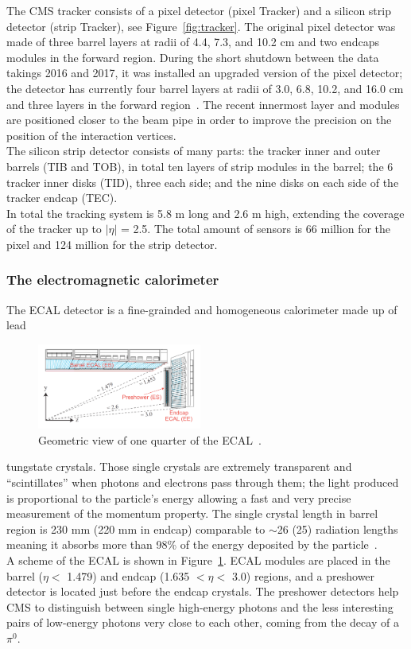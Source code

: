 The CMS tracker consists of a pixel detector (pixel Tracker) and a
silicon strip detector (strip Tracker), see Figure~\ref{fig:tracker}.
The original pixel detector was made of three barrel
layers at radii of 4.4, 7.3, and 10.2 cm and two endcaps modules in
the forward region. 
During the short shutdown between the data takings 2016 and 2017, it
was installed an
upgraded version of the pixel detector; the detector has currently four
barrel layers at radii of 3.0, 6.8, 10.2, and
16.0 cm and three layers in the forward region~\cite{Dominguez:1481838}. The
recent innermost layer and modules
are positioned closer to the beam pipe in order to improve the
precision on the position of the interaction vertices.\\
The silicon strip detector consists of many parts: the tracker inner and
outer barrels (TIB and TOB), in total ten layers of strip modules in
the barrel; the 6 tracker inner disks (TID), three each
side; and the nine disks on each side of the tracker endcap (TEC).\\
In total the tracking system is 5.8 m long and 2.6 m high,
extending the coverage of the tracker up to $|\eta|$ = 2.5. The total
amount of sensors is 66 million for the pixel and 124 million for the
strip detector. 

\subsubsection{The electromagnetic calorimeter}
The ECAL detector is a fine-grainded and homogeneous calorimeter
made up of lead
\begin{figure}
  \begin{center}
    \includegraphics[clip,trim=1cm 1cm 1cm 1.5cm, width=0.48\textwidth]{Figures/c2/ecal}
  \end{center}
  \caption{Geometric view of one quarter of the ECAL~\cite{Benaglia_2014}.}
\label{fig:ecal}
\end{figure}
 tungstate crystals. Those single crystals are extremely transparent
 and ``scintillates''  when photons and electrons pass through
 them; the light produced is proportional to the particle's energy
 allowing a fast and very precise measurement of the momentum
 property. The single crystal length in barrel region is 230 mm (220
 mm in endcap) comparable to $\sim$26 (25) radiation lengths meaning it
 absorbs more than 98\% of the energy deposited by the particle~\cite{Biino_2015}.\\
A scheme of the ECAL is shown in Figure~\ref{fig:ecal}.
ECAL modules are placed in the barrel ($\eta<$ 1.479) and endcap
(1.635 $<\eta<$ 3.0) regions, and a preshower detector is located just
before the endcap crystals. The preshower detectors help CMS to
distinguish between single high-energy photons and the less
interesting pairs of low-energy photons very close to each other, \ie
coming from the decay of a $\pi^0$. 

